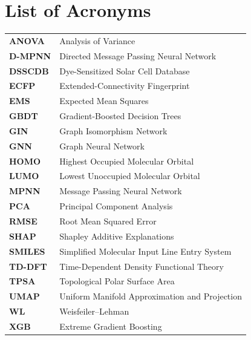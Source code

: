 \chapter*{List of Acronyms}

\begin{center}
\begin{tabular}{p{} p{}}
\textbf{ANOVA} & Analysis of Variance \\
\textbf{D-MPNN} & Directed Message Passing Neural Network \\
\textbf{DSSCDB} & Dye-Sensitized Solar Cell Database \\
\textbf{ECFP} & Extended-Connectivity Fingerprint \\
\textbf{EMS} & Expected Mean Squares \\
\textbf{GBDT} & Gradient-Boosted Decision Trees \\
\textbf{GIN} & Graph Isomorphism Network \\
\textbf{GNN} & Graph Neural Network \\
\textbf{HOMO} & Highest Occupied Molecular Orbital \\
\textbf{LUMO} & Lowest Unoccupied Molecular Orbital \\
\textbf{MPNN} & Message Passing Neural Network \\
\textbf{PCA} & Principal Component Analysis \\
\textbf{RMSE} & Root Mean Squared Error \\
\textbf{SHAP} & Shapley Additive Explanations \\
\textbf{SMILES} & Simplified Molecular Input Line Entry System \\
\textbf{TD-DFT} & Time-Dependent Density Functional Theory \\
\textbf{TPSA} & Topological Polar Surface Area \\
\textbf{UMAP} & Uniform Manifold Approximation and Projection \\
\textbf{WL} & Weisfeiler--Lehman \\
\textbf{XGB} & Extreme Gradient Boosting \\
\end{tabular}
\end{center}
